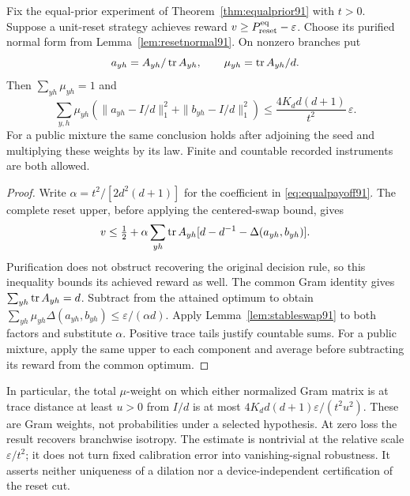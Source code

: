 \begin{corollary}\label{cor:resetstability91}
Fix the equal-prior experiment of Theorem~\ref{thm:equalprior91}
with $t>0$.  Suppose a unit-reset strategy achieves reward
$v\ge P_{\rm reset}^{\rm eq}-\varepsilon$.
Choose its purified normal form from Lemma~\ref{lem:resetnormal91}.
On nonzero branches put
\[
 a_{yh}=A_{yh}/\operatorname{tr} A_{yh},\qquad
 \mu_{yh}=\operatorname{tr} A_{yh}/d.
\]
Then $\sum_{yh}\mu_{yh}=1$ and
\begin{equation}\label{eq:resetstability91}
 \sum_{y,h}\mu_{yh}
 \left(\|a_{yh}-I/d\|_1^2+\|b_{yh}-I/d\|_1^2\right)
 \le \frac{4K_d d(d+1)}{t^2}\,\varepsilon.
\end{equation}
For a public mixture the same conclusion holds after adjoining the
seed and multiplying these weights by its law.  Finite and countable
recorded instruments are both allowed.
\end{corollary}
\begin{proof}
Write $\alpha=t^2/[2d^2(d+1)]$ for the coefficient in
\eqref{eq:equalpayoff91}.  The complete reset upper, before applying
the centered-swap bound, gives
\[
 v\le\tfrac12+\alpha\sum_{yh}\operatorname{tr} A_{yh}
          [d-d^{-1}-\Delta(a_{yh},b_{yh})].
\]
Purification does not obstruct recovering the original decision rule,
so this inequality bounds its achieved reward as well.  The common
Gram identity gives $\sum_{yh}\operatorname{tr} A_{yh}=d$.  Subtract from the
attained optimum to obtain
$\sum_{yh}\mu_{yh}\Delta(a_{yh},b_{yh})
\le\varepsilon/(\alpha d)$.
Apply Lemma~\ref{lem:stableswap91} to both factors and substitute
$\alpha$.  Positive trace tails justify countable sums.  For a public
mixture, apply the same upper to each component and average before
subtracting its reward from the common optimum.
\end{proof}
In particular, the total $\mu$-weight on which either normalized Gram
matrix is at trace distance at least $u>0$ from $I/d$ is at most
$4K_d d(d+1)\varepsilon/(t^2u^2)$.  These are Gram weights, not
probabilities under a selected hypothesis.  At zero loss the result
recovers branchwise isotropy.  The estimate is nontrivial at the
relative scale $\varepsilon/t^2$; it does not turn fixed calibration
error into vanishing-signal robustness.  It asserts neither uniqueness
of a dilation nor a device-independent certification of the reset cut.
